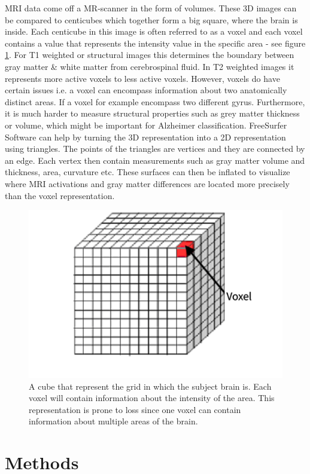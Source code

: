 \documentclass[12pt, fleqn, titlepage]{article}
\begin{document}
MRI data come off a MR-scanner in the form of volumes. These 3D images can be compared to centicubes which together form a big square, where the brain is inside. Each centicube in this image is often referred to as a voxel and each voxel contains a value that represents the intensity value in the specific area - see figure \ref{fig:voxel}. For T1 weighted or structural images this determines the boundary between gray matter \& white matter from cerebrospinal fluid. In T2 weighted images it represents more active voxels to  less active voxels. However, voxels do have certain issues i.e. a voxel can encompass information about two anatomically distinct areas. If a voxel for example encompass two different gyrus. Furthermore, it is much harder to measure structural properties such as grey matter thickness or volume, which might be important for Alzheimer classification. FreeSurfer Software can help by turning the 3D representation into a 2D representation using triangles. The points of the triangles are vertices and they are connected by an edge. Each vertex then contain measurements such as gray matter volume and thickness, area, curvature etc. These surfaces can then be inflated to visualize where MRI activations and gray matter differences are located more precisely than the voxel representation. 

\begin{figure}[H]
	\centering
	\includegraphics[width=0.6\linewidth]{imgs/voxel}
	\caption{A cube that represent the grid in which the subject brain is. Each voxel will contain information about the intensity of the area. This representation is prone to loss since one voxel can contain information about multiple areas of the brain.}
	\label{fig:voxel}
\end{figure}



\section{Methods}
\end{document}

